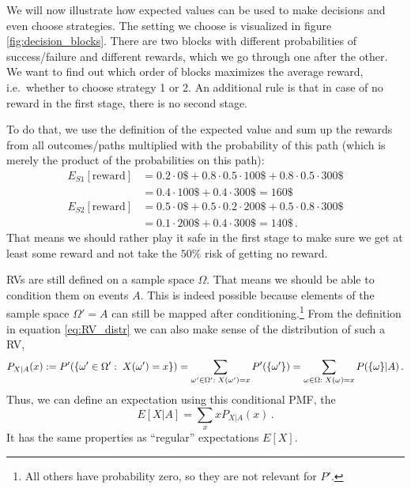 \begin{ex}
We will now illustrate how expected values can be used to make decisions and even choose strategies. The setting we choose is visualized in figure \ref{fig:decision_blocks}. There are two blocks with different probabilities of success/failure and different rewards, which we go through one after the other. We want to find out which order of blocks maximizes the average reward, i.e.~whether to choose strategy 1 or 2. An additional rule is that in case of no reward in the first stage, there is no second stage.

To do that, we use the definition of the expected value and sum up the rewards from all outcomes/paths multiplied with the probability of this path (which is merely the product of the probabilities on this path):
\begin{align*}
E_{S1}[\text{reward}] &= 0.2 \cdot 0\$ + 0.8 \cdot 0.5 \cdot 100\$ + 0.8 \cdot 0.5 \cdot 300\$
\\
&= 0.4 \cdot 100\$ + 0.4 \cdot 300\$ = 160\$
\\
E_{S2}[\text{reward}] &= 0.5 \cdot 0\$ + 0.5 \cdot 0.2 \cdot 200\$ + 0.5 \cdot 0.8 \cdot 300\$
\\
&= 0.1 \cdot 200\$ + 0.4 \cdot 300\$ = 140\$ \, .
\end{align*}
That means we should rather play it safe in the first stage to make sure we get at least some reward and not take the $50\%$ risk of getting no reward.
\end{ex}



RVs are still defined on a sample space $\Omega$. That means we should be able to condition them on events $A$. This is indeed possible because elements of the sample space $\Omega' = A$ can still be mapped after conditioning.\footnote{All others have probability zero, so they are not relevant for $P'$.} From the definition in equation \eqref{eq:RV_distr} we can also make sense of the distribution of such a RV,
\begin{equation}
P_{X | A}(x) := P'(\qty{\omega' \in \Omega': \; X(\omega') = x}) = \sum_{\omega' \in \Omega': \; X(\omega') = x} P'(\qty{\omega'}) = \sum_{\omega \in \Omega: \; X(\omega) = x} P(\{\omega\} | A) \, .
\end{equation}
Thus, we can define an expectation using this conditional PMF, the 
\begin{equation}
E[X | A] = \sum_x x P_{X | A}(x) \, .
\end{equation}
It has the same properties as \enquote{regular} expectations $E[X]$.


